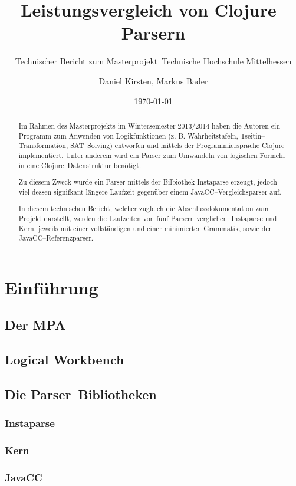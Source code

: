 \documentclass[ngerman,a4paper,abstracton,open=right,twoside=false,toc=listofnumbered]{scrreprt}
\title{Leistungsvergleich von Clojure--Parsern}
\subtitle{Technischer Bericht zum Masterprojekt\
Technische Hochschule Mittelhessen}
\author{Daniel Kirsten, Markus Bader}
\date{\today}
\begin{document}
\maketitle
\newpage
\begin{abstract}

Im Rahmen des Masterprojekts im Wintersemester 2013/2014 haben die Autoren ein
Programm zum Anwenden von Logikfunktionen (z. B. Wahrheitstafeln,
Tseitin--Transformation, SAT--Solving) entworfen und mittels der
Programmiersprache Clojure implementiert. Unter anderem wird ein Parser zum
Umwandeln von logischen Formeln in eine Clojure--Datenstruktur benötigt.

Zu diesem Zweck wurde ein Parser mittels der Bilbiothek Instaparse erzeugt,
jedoch viel dessen signifkant längere Laufzeit gegenüber einem
JavaCC--Vergleichsparser auf. 

In diesem technischen Bericht, welcher zugleich die Abschlussdokumentation zum
Projekt darstellt, werden die Laufzeiten von fünf Parsern verglichen: Instaparse
und Kern, jeweils mit einer vollständigen und einer minimierten Grammatik, sowie
der JavaCC--Referenzparser.

\end{abstract}
\newpage
\tableofcontents
\newpage

\chapter{Einführung}
\section{Der MPA}
\section{Logical Workbench}
\section{Die Parser--Bibliotheken}
\subsection{Instaparse}
\subsection{Kern}
\subsection{JavaCC}
\end{document}
